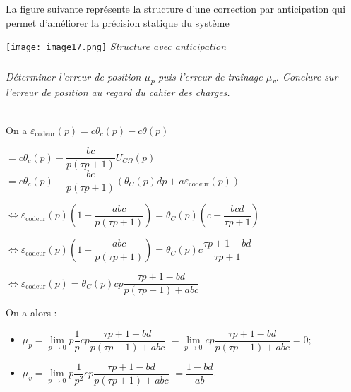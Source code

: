 \begin{multicols}{2}
%
%  
%  

\ifprof
\else

La figure suivante représente la structure d'une correction par anticipation
qui permet d'améliorer la précision statique du système

\begin{center}
\texttt{[image: image17.png]}
\textit{Structure avec anticipation \label{fig16}}
\end{center}
\fi

\subparagraph{\label{q13}}\textit{Déterminer l'erreur de position $\mu$\emph{\textsubscript{p}} puis
  l'erreur de traînage $\mu$\emph{\textsubscript{v}}. Conclure sur l'erreur
  de position au regard du cahier des charges.}
\ifprof
\begin{corrige} ~\\

On a 
$\varepsilon_{\text{codeur}}(p)=c\theta_c(p)-c\theta(p)$ 

$=c\theta_c(p)-\dfrac{bc}{p\left(\tau p + 1 \right)}U_{C \Omega }(p)$
 $=c\theta_c(p)-\dfrac{bc}{p\left(\tau p + 1 \right)}\left( \theta_C(p) dp + a \varepsilon_{\text{codeur}}(p) \right)$

$\Leftrightarrow \varepsilon_{\text{codeur}}(p)\left(1+\dfrac{abc}{p\left(\tau p + 1 \right)}\right) = \theta_C(p)  \left(c-\dfrac{bcd}{\tau p + 1 } \right)$

$\Leftrightarrow \varepsilon_{\text{codeur}}(p)\left(1+\dfrac{abc}{p\left(\tau p + 1 \right)}\right) = \theta_C(p)  c \dfrac{\tau p + 1 -bd}{\tau p + 1 } $

$\Leftrightarrow \varepsilon_{\text{codeur}}(p) = \theta_C(p)  cp \dfrac{\tau p + 1 -bd}{p\left(\tau p + 1 \right)+abc} $

On a alors : 
\begin{itemize}
\item $\mu_p=\lim\limits_{p\to0}  p\dfrac{1}{p}  cp \dfrac{\tau p + 1 -bd}{p\left(\tau p + 1 \right)+abc}$ $=\lim\limits_{p\to0}  cp \dfrac{\tau p + 1 -bd}{p\left(\tau p + 1 \right)+abc}=0$;
\item $\mu_v=\lim\limits_{p\to0}  p\dfrac{1}{p^2}  cp \dfrac{\tau p + 1 -bd}{p\left(\tau p + 1 \right)+abc}$ 
$= \dfrac{1 -bd}{ab}$.
\end{itemize}


\end{corrige}
\end{multicols}
